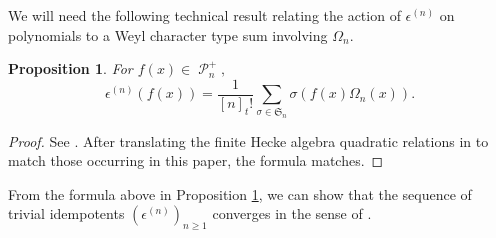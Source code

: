 \documentclass[11pt]{article}
\newtheorem{prop}[theo]{Proposition}
\theoremstyle{definition}
\numberwithin{equation}{section}
\DeclareMathOperator{\sP}{\mathscr{P} }
\begin{document}
We will need the following technical result relating the action of $\epsilon^{(n)}$ on polynomials to a Weyl character type sum involving $\Omega_n$.

\begin{prop}\label{idempotent from HL kernel}
    For $f(x) \in \sP_n^{+},$ 
    \begin{equation}
        \epsilon^{(n)}(f(x)) = \frac{1}{[n]_{t}!} \sum_{\sigma \in \mathfrak{S}_n} \sigma( f(x)\Omega_n(x) ).
    \end{equation}
\end{prop}
\begin{proof}
   See \cite[Remark 4.17]{ram2006alcove}. After translating the finite Hecke algebra quadratic relations in \cite{ram2006alcove} to match those occurring in this paper, the formula matches.
\end{proof}

From the formula above in Proposition \ref{idempotent from HL kernel}, we can show that the sequence of trivial idempotents $(\epsilon^{(n)})_{n\geq 1}$ converges in the sense of \cite{Ion_2022}. 
\end{document}
